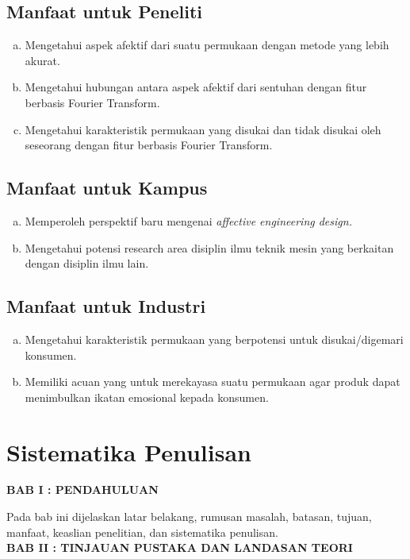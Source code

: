 \subsection{Manfaat untuk Peneliti}
\begin{enumerate}[a.]
	\item Mengetahui aspek afektif dari suatu permukaan dengan metode yang lebih akurat.
	\item Mengetahui hubungan antara aspek afektif dari sentuhan dengan fitur berbasis Fourier Transform.
	\item Mengetahui karakteristik permukaan yang disukai dan tidak disukai oleh seseorang dengan fitur berbasis Fourier Transform.
\end{enumerate}

\subsection{Manfaat untuk Kampus}
\begin{enumerate}[a.]
	\item Memperoleh perspektif baru mengenai \emph{affective engineering design.}
	\item Mengetahui potensi research area disiplin ilmu teknik mesin yang berkaitan dengan disiplin ilmu lain.
\end{enumerate}

\subsection{Manfaat untuk Industri}
\begin{enumerate}[a.]
	\item Mengetahui karakteristik permukaan yang berpotensi untuk disukai/digemari konsumen.
	\item Memiliki acuan yang untuk merekayasa suatu permukaan agar produk dapat menimbulkan ikatan emosional kepada konsumen.
\end{enumerate}

\section{Sistematika Penulisan}
\noindent
\textbf{BAB I : PENDAHULUAN}

Pada bab ini dijelaskan latar belakang, rumusan masalah, batasan, tujuan, manfaat, keaslian penelitian, dan sistematika penulisan.\\

\noindent
\textbf{BAB II : TINJAUAN PUSTAKA DAN LANDASAN TEORI}

